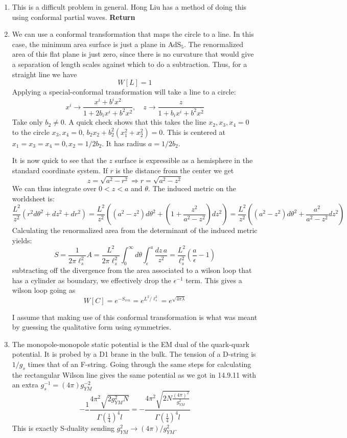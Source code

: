 \documentclass[11pt, class=article, crop=false]{standalone}
\begin{document}
\begin{enumerate}
	\item This is a difficult problem in general. Hong Liu has a method of doing this using conformal partial waves. \textbf{Return}
	
	\item We can use a conformal transformation that maps the circle to a line. In this case, the minimum area surface is just a plane in AdS$_5$. The renormalized area of this flat plane is just zero, since there is no curvature that would give a separation of length scales against which to do a subtraction. Thus, for a straight line we have 
	\[
		W[L] = 1
	\]
	Applying a special-conformal transformation will take a line to a circle:
	\[
		x^i \to \frac{x^i + b^i x^2}{1 + 2 b_i x^i + b^2 x^2}, \quad z \to \frac{z}{1+ b_i x^i + b^2 x^2}
	\]
	Take only $b_2 \neq 0$. A quick check shows that this takes the line $x_2, x_3, x_4 = 0$ to the circle $x_3, x_4 = 0$, $b_2 x_2 + b_2^2 (x_1^2 + x_2^2) = 0$. This is centered at $x_1 = x_3 = x_4 =0, x_2 =1/2 b_2$. It has radius $a = 1/2b_2$.
	
	It is now quick to see that the $z$ surface is expressible as a hemisphere in the standard coordinate system. If $r$ is the distance from the center we get
	\[
		z = \sqrt{a^2 - r^2} \Rightarrow r = \sqrt{a^2 - z^2}
	\]
	We can thus integrate over $0 < z < a$ and $\theta$. The induced metric on the worldsheet is:
	\[
		\frac{L^2}{z^2} \left( r^2 d\theta^2 + dz^2 + dr^2 \right) = \frac{L^2}{z^2} \left( (a^2 - z^2) d\theta^2 + \left(1 + \frac{z^2}{a^2 - z^2} \right) dz^2 \right) = \frac{L^2}{z^2} \left( (a^2 - z^2) d\theta^2 + \frac{a^2}{a^2 - z^2} dz^2 \right)
	\]
	Calculating the renormalized area from the determinant of the induced metric yields:
	\[
		S = \frac{1}{2 \pi \ell_s^2} A = \frac{L^2}{2 \pi \ell_s^2} \int_0^\infty d\theta \int_\epsilon^a  \frac{dz\, a}{z^2} = \frac{L^2}{\ell_s^2} \left(\frac{a}{\epsilon} - 1\right)
	\]
	subtracting off the divergence from the area associated to a wilson loop that has a cylinder as boundary, we effectively drop the $\epsilon^{-1}$ term. This gives a wilson loop going as
	\[
		W[C] = e^{-S_{ren}} = e^{L^2/\ell_s^2} = e^{\sqrt{4 \pi \lambda}}
	\]
	
	I assume that making use of this conformal transformation is what was meant by guessing the qualitative form using symmetries. 
	
	\item The monopole-monopole static potential is the EM dual of the quark-quark potential. It is probed by a D1 brane in the bulk. The tension of a D-string is $1/g_s$ times that of an F-string. Going through the same steps for calculating the rectangular Wilson line gives the same potential as we got in 14.9.11 with an extra $g_s^{-1} = (4 \pi) g_{YM}^{-2}$
	\[
		- \frac{1}{} \frac{4 \pi^2 \sqrt{2 g_{YM}^2 N}}{\Gamma(\frac14)^4 l} = - \frac{4 \pi^2 \sqrt{2 N \frac{(4 \pi)^2}{g_{YM}^2}}}{ \Gamma(\frac14)^4 l}
	\]
	This is exactly S-duality sending $g_{YM}^2 \to (4\pi)/g_{YM}^2$.
	

\end{enumerate}
\end{document}
